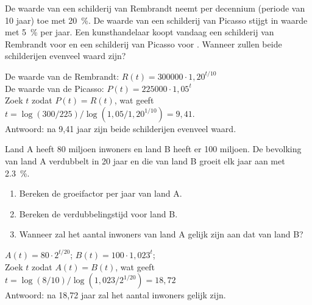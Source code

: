 \begin{oef}
  De waarde van een schilderij van Rembrandt neemt per
      decennium (periode van 10 jaar) toe met \SI{20}{\percent}. De waarde van een schilderij
      van Picasso stijgt in waarde met \SI{5}{\percent}  per jaar. Een
      kunsthandelaar koopt vandaag een schilderij van Rembrandt voor
       en een schilderij van Picasso voor
      .
      Wanneer zullen beide schilderijen evenveel waard zijn?
      \begin{opl}
         De waarde van de Rembrandt: $R(t)=300000\cdot 1,20^{t/10}$\\
         De waarde van de Picasso: $P(t)=225000\cdot 1,05^t$\\
         Zoek $t$ zodat $P(t)=R(t)$, wat geeft $t=\log(300/225)/\log(1,05/1,20^{1/10})=9,41$.\\
         Antwoord: na 9,41 jaar zijn beide schilderijen evenveel waard.
      \end{opl}
\end{oef}

\begin{oef}
 Land A heeft 80 miljoen inwoners en land B heeft er 100
      miljoen. De bevolking van land A verdubbelt in 20 jaar en die
      van land B groeit elk jaar aan met \SI{2,3}{\percent}.
      \begin{enumerate}
          \item  Bereken de groeifactor per jaar van land A.
      \item Bereken de verdubbelingstijd voor land B.
          \item Wanneer zal het aantal inwoners van land A gelijk zijn
            aan dat van land B?
      \end{enumerate}
      \begin{opl}
	$A(t)=80\cdot 2^{t/20}$; $B(t)=100\cdot 1,023^t$;\\
	Zoek $t$ zodat $A(t)=B(t)$, wat geeft $t=\log(8/10)/\log(1,023/2^{1/20})=18,72$\\
	Antwoord: na 18,72 jaar zal het aantal inwoners gelijk zijn.
      \end{opl}
\end{oef}

